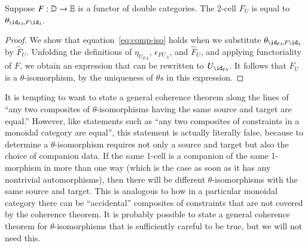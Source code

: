 
\begin{lem}\label{lem:FUtheta}
Suppose $F:\mathbb{D} \rightarrow \mathbb{E}$ is a functor of double categories. The 2-cell $F_U$ is equal to $\theta_{\id_{FA}, F\id_A}$.
\end{lem}

\begin{proof}
We show that equation~\eqref{eq:comp-iso} holds when we substitute $\theta_{\id_{FA}, F\id_A}$ by $\hat{F}_U$.  Unfolding the definitions of $\eta_{U_{FA}}$, $\epsilon_{FU_A}$, and $\hat{F}_U$, and applying functoriality of $F$, we obtain an expression that can be rewritten to $U_{\id_{FA}}$. It follows that $F_U$ is a $\theta$-isomorphism, by the uniqueness of $\theta s$ in this expression.
\end{proof}

\begin{rmk}
  It is tempting to want to state a general coherence theorem along the lines of ``any two composites of $\theta$-isomorphisms having the same source and target are equal.''
  However, like statements such as ``any two composites of constraints in a monoidal category are equal'', this statement is actually literally false, because to determine a $\theta$-isomorphism requires not only a source and target but also the choice of companion data.
  If the same 1-cell is a companion of the same 1-morphism in more than one way (which is the case as soon as it has any nontrivial automorphisms), then there will be different $\theta$-isomorphisms with the same source and target.
  This is analogous to how in a particular monoidal category there can be ``accidental'' composites of constraints that are not covered by the coherence theorem.
  It is probably possible to state a general coherence theorem for $\theta$-isomorphisms that is sufficiently careful to be true, but we will not need this.
\end{rmk}

